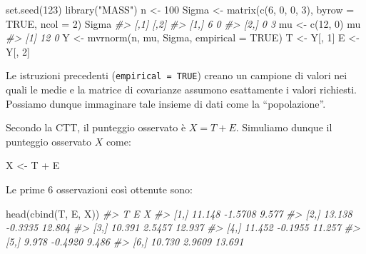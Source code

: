 \documentclass[
  11pt,
]{krantz}
\makeatletter
\newenvironment{Shaded}{\begin{snugshade}}{\end{snugshade}}
\newcommand{\AttributeTok}[1]{\textcolor[rgb]{0.61,0.61,0.61}{#1}}
\newcommand{\CommentTok}[1]{\textcolor[rgb]{0.37,0.37,0.37}{\textit{#1}}}
\newcommand{\ConstantTok}[1]{\textcolor[rgb]{0,0,0}{#1}}
\newcommand{\DecValTok}[1]{\textcolor[rgb]{0.06,0.06,0.06}{#1}}
\newcommand{\FunctionTok}[1]{\textcolor[rgb]{0,0,0}{#1}}
\newcommand{\NormalTok}[1]{#1}
\newcommand{\OtherTok}[1]{\textcolor[rgb]{0.37,0.37,0.37}{#1}}
\newcommand{\SpecialCharTok}[1]{\textcolor[rgb]{0,0,0}{#1}}
\newcommand{\StringTok}[1]{\textcolor[rgb]{0.5,0.5,0.5}{#1}}
\newenvironment{kframe}{%
\medskip{}
\setlength{\fboxsep}{.8em}
 \def\at@end@of@kframe{}%
 \ifinner\ifhmode%
  \def\at@end@of@kframe{\end{minipage}}%
  \begin{minipage}{\columnwidth}%
 \fi\fi%
 \def\FrameCommand##1{\hskip\@totalleftmargin \hskip-\fboxsep
 \colorbox{shadecolor}{##1}\hskip-\fboxsep
     \hskip-\linewidth \hskip-\@totalleftmargin \hskip\columnwidth}%
 \MakeFramed {\advance\hsize-\width
   \@totalleftmargin\z@ \linewidth\hsize
   \@setminipage}}%
 {\par\unskip\endMakeFramed%
 \at@end@of@kframe}
\renewenvironment{Shaded}{\begin{kframe}}{\end{kframe}}
\theoremstyle{definition}
\theoremstyle{definition}
\theoremstyle{definition}
\theoremstyle{definition}
\theoremstyle{remark}
\makeatother
\begin{document}
\begin{Shaded}
\begin{Highlighting}[]
\FunctionTok{set.seed}\NormalTok{(}\DecValTok{123}\NormalTok{)}
\FunctionTok{library}\NormalTok{(}\StringTok{"MASS"}\NormalTok{)}
\NormalTok{n }\OtherTok{\textless{}{-}} \DecValTok{100}
\NormalTok{Sigma }\OtherTok{\textless{}{-}} \FunctionTok{matrix}\NormalTok{(}\FunctionTok{c}\NormalTok{(}\DecValTok{6}\NormalTok{, }\DecValTok{0}\NormalTok{, }\DecValTok{0}\NormalTok{, }\DecValTok{3}\NormalTok{), }\AttributeTok{byrow =} \ConstantTok{TRUE}\NormalTok{, }\AttributeTok{ncol =} \DecValTok{2}\NormalTok{)}
\NormalTok{Sigma}
\CommentTok{\#\textgreater{}      [,1] [,2]}
\CommentTok{\#\textgreater{} [1,]    6    0}
\CommentTok{\#\textgreater{} [2,]    0    3}
\NormalTok{mu }\OtherTok{\textless{}{-}} \FunctionTok{c}\NormalTok{(}\DecValTok{12}\NormalTok{, }\DecValTok{0}\NormalTok{)}
\NormalTok{mu}
\CommentTok{\#\textgreater{} [1] 12  0}
\NormalTok{Y }\OtherTok{\textless{}{-}} \FunctionTok{mvrnorm}\NormalTok{(n, mu, Sigma, }\AttributeTok{empirical =} \ConstantTok{TRUE}\NormalTok{)}
\NormalTok{T }\OtherTok{\textless{}{-}}\NormalTok{ Y[, }\DecValTok{1}\NormalTok{]}
\NormalTok{E }\OtherTok{\textless{}{-}}\NormalTok{ Y[, }\DecValTok{2}\NormalTok{]}
\end{Highlighting}
\end{Shaded}

Le istruzioni precedenti (\texttt{empirical\ =\ TRUE}) creano un campione di valori nei quali le medie e la matrice di covarianze assumono esattamente i valori richiesti. Possiamo dunque immaginare tale insieme di dati come la ``popolazione''.

Secondo la CTT, il punteggio osservato è \(X = T + E\). Simuliamo dunque il punteggio osservato \(X\) come:

\begin{Shaded}
\begin{Highlighting}[]
\NormalTok{X }\OtherTok{\textless{}{-}}\NormalTok{ T }\SpecialCharTok{+}\NormalTok{ E}
\end{Highlighting}
\end{Shaded}

Le prime 6 osservazioni così ottenute sono:

\begin{Shaded}
\begin{Highlighting}[]
\FunctionTok{head}\NormalTok{(}\FunctionTok{cbind}\NormalTok{(T, E, X))}
\CommentTok{\#\textgreater{}           T       E      X}
\CommentTok{\#\textgreater{} [1,] 11.148 {-}1.5708  9.577}
\CommentTok{\#\textgreater{} [2,] 13.138 {-}0.3335 12.804}
\CommentTok{\#\textgreater{} [3,] 10.391  2.5457 12.937}
\CommentTok{\#\textgreater{} [4,] 11.452 {-}0.1955 11.257}
\CommentTok{\#\textgreater{} [5,]  9.978 {-}0.4920  9.486}
\CommentTok{\#\textgreater{} [6,] 10.730  2.9609 13.691}
\end{Highlighting}
\end{Shaded}
\end{document}
